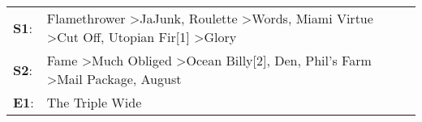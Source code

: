 \begin{supertabular}{p{0.03\textwidth}p{0.92\textwidth}}
 \textbf{S1}:  &  Flamethrower\textsuperscript{} \textgreater \enspace JaJunk\textsuperscript{}, \enspace Roulette\textsuperscript{} \textgreater \enspace Words\textsuperscript{}, \enspace Miami Virtue\textsuperscript{} \textgreater \enspace Cut Off\textsuperscript{}, \enspace Utopian Fir[1]\textsuperscript{} \textgreater \enspace Glory\textsuperscript{}  \enspace  \\
 \textbf{S2}:  &                                                  Fame\textsuperscript{} \textgreater \enspace Much Obliged\textsuperscript{} \textgreater \enspace Ocean Billy[2]\textsuperscript{}, \enspace Den\textsuperscript{}, \enspace Phil's Farm\textsuperscript{} \textgreater \enspace Mail Package\textsuperscript{}, \enspace August\textsuperscript{}  \enspace  \\
 \textbf{E1}:  &                                                                                                                                                                                                                                                                                                                   The Triple Wide\textsuperscript{}  \enspace  \\
\end{supertabular}
